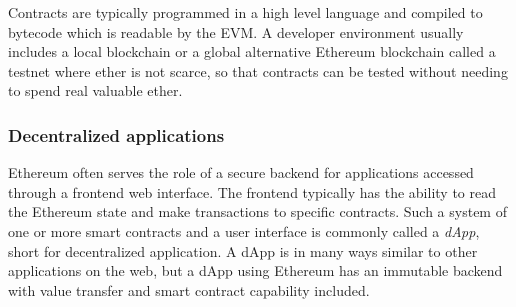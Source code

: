 Contracts are typically programmed in a high level language and compiled to bytecode which is readable by the EVM. A developer environment usually includes a local blockchain or a global alternative Ethereum blockchain called a testnet where ether is not scarce, so that contracts can be tested without needing to spend real valuable ether.

\subsubsection{Decentralized applications}
Ethereum often serves the role of a secure backend for applications accessed through a frontend web interface. The frontend typically has the ability to read the Ethereum state and make transactions to specific contracts. Such a system of one or more smart contracts and a user interface is commonly called a \emph{dApp}, short for decentralized application. A dApp is in many ways similar to other applications on the web, but a dApp using Ethereum has an immutable backend with value transfer and smart contract capability included.
